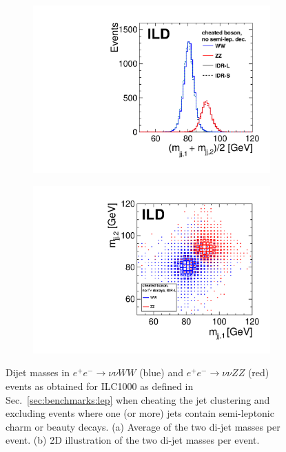 \begin{figure}[htbp]
\begin{subfigure}{0.475\hsize} \includegraphics[width=\textwidth]{Performance/fig/ls_comp_icn_noSLD_monly.pdf}
 \caption{ \label{fig:qgc:cheat:1d}}
 \end{subfigure}
\begin{subfigure}{0.49\hsize} \includegraphics[width=\textwidth]{Performance/fig/m_m_icn_noSLD.pdf}
 \caption{  \label{fig:qgc:cheat:2d}}
 \end{subfigure}
\caption{Dijet masses in $e^+e^- \to \nu\nu WW$ (blue) and $e^+e^- \to \nu\nu ZZ$ (red) events as obtained for ILC1000 as defined in Sec.~\ref{sec:benchmarks:lep} when cheating the jet clustering and excluding events where one (or more) jets contain semi-leptonic charm or beauty decays.
(a) Average of the two di-jet masses per event. 
(b) 2D illustration of the two di-jet masses per event.
}
\label{fig:qgc:cheat}
\end{figure}


